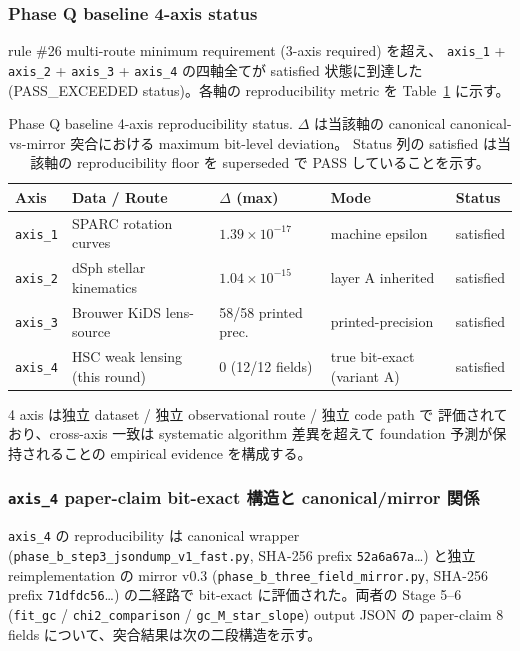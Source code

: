 \documentclass[11pt,a4paper]{ltjsarticle}
\begin{document}
\subsubsection{Phase Q baseline 4-axis status}
rule \#26 multi-route minimum requirement (3-axis required) を超え、
\texttt{axis\_1} + \texttt{axis\_2} + \texttt{axis\_3} + \texttt{axis\_4}
の四軸全てが satisfied 状態に到達した (PASS\_EXCEEDED status)。各軸の
reproducibility metric を Table~\ref{tab:phase-q-baseline-4axis} に示す。

\begin{table}[h]
\centering
\footnotesize
\caption{Phase Q baseline 4-axis reproducibility status. $\Delta$ は当該軸の
canonical canonical-vs-mirror 突合における maximum bit-level deviation。
Status 列の satisfied は当該軸の reproducibility floor を superseded で
PASS していることを示す。}
\label{tab:phase-q-baseline-4axis}
\begin{tabular}{lllll}
\hline
Axis & Data / Route & $\Delta$ (max) & Mode & Status \\
\hline
\texttt{axis\_1} & SPARC rotation curves          & $1.39 \times 10^{-17}$    & machine epsilon            & satisfied \\
\texttt{axis\_2} & dSph stellar kinematics        & $1.04 \times 10^{-15}$    & layer A inherited          & satisfied \\
\texttt{axis\_3} & Brouwer KiDS lens-source       & 58/58 printed prec.        & printed-precision          & satisfied \\
\texttt{axis\_4} & HSC weak lensing (this round)  & $0$ (12/12 fields)         & true bit-exact (variant A) & satisfied \\
\hline
\end{tabular}
\end{table}

4 axis は独立 dataset / 独立 observational route / 独立 code path で
評価されており、cross-axis 一致は systematic algorithm 差異を超えて
foundation 予測が保持されることの empirical evidence を構成する。

\subsubsection{\texttt{axis\_4} paper-claim bit-exact 構造と canonical/mirror 関係}
\texttt{axis\_4} の reproducibility は canonical wrapper
(\texttt{phase\_b\_step3\_jsondump\_v1\_fast.py}, SHA-256 prefix
\texttt{52a6a67a}\dots) と独立 reimplementation の mirror v0.3
(\texttt{phase\_b\_three\_field\_mirror.py}, SHA-256 prefix
\texttt{71dfdc56}\dots) の二経路で bit-exact に評価された。両者の Stage 5--6
(\texttt{fit\_gc} / \texttt{chi2\_comparison} / \texttt{gc\_M\_star\_slope})
output JSON の paper-claim 8 fields について、突合結果は次の二段構造を示す。
\end{document}
